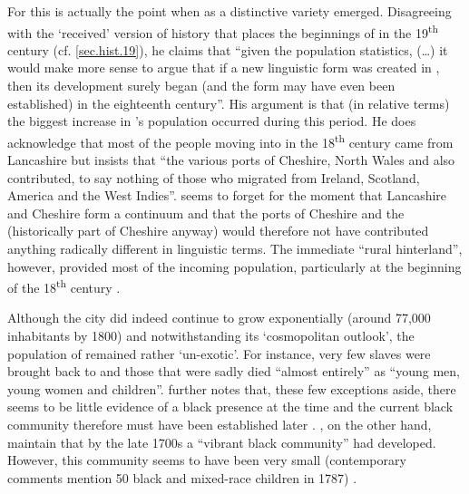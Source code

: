 For \citet[28]{crowley2012} this is actually the point when  as a distinctive variety emerged.
Disagreeing with the `received' version of  history that places the beginnings of  in the 19\textsuperscript{th} century (cf. \ref{sec.hist.19}), he claims that ``given the population statistics, (\dots) it would make more sense to argue that if a new linguistic form was created in , then its development surely began (and the form may have even been established) in the eighteenth century''.
His argument is that (in relative terms) the biggest increase in 's population occurred during this period.
He does acknowledge that most of the people moving into  in the 18\textsuperscript{th} century came from Lancashire but insists that ``the various ports of Cheshire, North Wales and  also contributed, to say nothing of those who migrated from Ireland, Scotland, America and the West Indies''.
\citeauthor{crowley2012} seems to forget for the moment that Lancashire and Cheshire form a  continuum and that the ports of Cheshire and the  (historically part of Cheshire anyway) would therefore not have contributed anything radically different in linguistic terms.
The immediate ``rural hinterland'', however, provided most of the incoming population, particularly at the beginning of the 18\textsuperscript{th} century \parencite[cf.][119]{longmore2006}.

Although the city did indeed continue to grow exponentially (around 77,000 inhabitants by 1800) and notwithstanding its `cosmopolitan outlook', the population of  remained rather `un-exotic'.
For instance, very few slaves were brought back to  and those that were sadly died ``almost entirely'' as ``young men, young women and children''.
\citeauthor{longmore2006} further notes that, these few exceptions aside, there seems to be little evidence of a black presence at the time and the current black community therefore must have been established later \citeyearpar[cf.][161 and 169]{longmore2006}. \citeauthor{belchemmacraild2006}, on the other hand, maintain that by the late 1700s a ``vibrant black community'' had developed. However, this community seems to have been very small (contemporary comments mention 50 black and mixed-race children in 1787) \citeyearpar[324]{belchemmacraild2006}.

